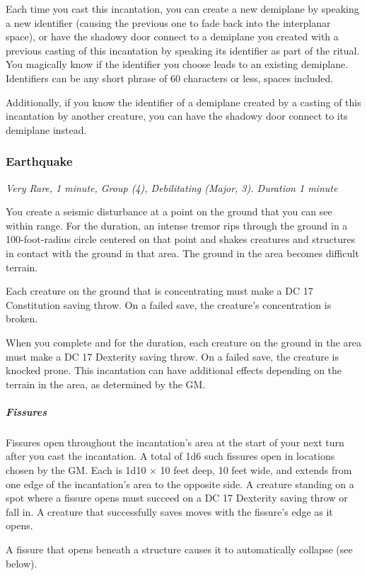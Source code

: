 Each time you cast this incantation, you can create a new demiplane by speaking a new identifier (causing the previous one to fade back into the interplanar space), or have the shadowy door connect to a demiplane you created with a previous casting of this incantation by speaking its identifier as part of the ritual. You magically know if the identifier you choose leads to an existing demiplane. Identifiers can be any short phrase of 60 characters or less, spaces included.

Additionally, if you know the identifier of a demiplane created by a casting of this incantation by another creature, you can have the shadowy door connect to its demiplane instead.

\subsubsection{Earthquake}
\textit{Very Rare, 1 minute, Group (4), Debilitating (Major, 3). Duration 1 minute}

You create a seismic disturbance at a point on the ground that you can see within range. For the duration, an intense tremor rips through the ground in a 100-foot-radius circle centered on that point and shakes creatures and structures in contact with the ground in that area. The ground in the area becomes difficult terrain.

Each creature on the ground that is concentrating must make a DC 17 Constitution saving throw. On a failed save, the creature's concentration is broken.

When you complete and for the duration, each creature on the ground in the area must make a DC 17 Dexterity saving throw. On a failed save, the creature is knocked prone. This incantation can have additional effects depending on the terrain in the area, as determined by the GM.

\subparagraph*{Fissures} Fissures open throughout the incantation's area at the start of your next turn after you cast the incantation. A total of 1d6 such fissures open in locations chosen by the GM. Each is 1d10 × 10 feet deep, 10 feet wide, and extends from one edge of the incantation's area to the opposite side. A creature standing on a spot where a fissure opens must succeed on a DC 17 Dexterity saving throw or fall in. A creature that successfully saves moves with the fissure's edge as it opens.

A fissure that opens beneath a structure causes it to automatically collapse (see below).

